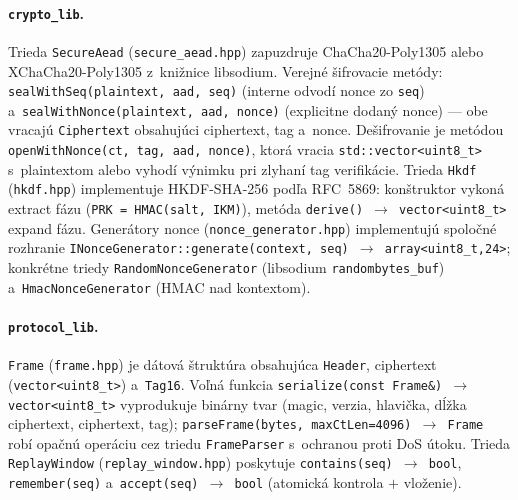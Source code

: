 \documentclass[a4paper]{feidipsp}
\begin{document}
\paragraph{\texttt{crypto\_lib}.}
Trieda \texttt{SecureAead} (\texttt{secure\_aead.hpp}) zapuzdruje ChaCha20-Poly1305 alebo XChaCha20-Poly1305 z~knižnice libsodium. Verejné šifrovacie metódy: \texttt{sealWithSeq(plaintext, aad, seq)} (interne odvodí nonce zo \texttt{seq}) a~\texttt{sealWithNonce(plaintext, aad, nonce)} (explicitne dodaný nonce) --- obe vracajú \texttt{Ciphertext} obsahujúci ciphertext, tag a~nonce. Dešifrovanie je metódou \texttt{openWithNonce(ct, tag, aad, nonce)}, ktorá vracia \texttt{std::vector<uint8\_t>} s~plaintextom alebo vyhodí výnimku pri zlyhaní tag verifikácie. Trieda \texttt{Hkdf} (\texttt{hkdf.hpp}) implementuje HKDF-SHA-256 podľa RFC~5869: konštruktor vykoná extract fázu (\texttt{PRK = HMAC(salt, IKM)}), metóda \texttt{derive() $\rightarrow$ vector<uint8\_t>} expand fázu. Generátory nonce (\texttt{nonce\_generator.hpp}) implementujú spoločné rozhranie \texttt{INonceGenerator::generate(context, seq) $\rightarrow$ array<uint8\_t,24>}; konkrétne triedy \texttt{RandomNonceGenerator} (libsodium \texttt{randombytes\_buf}) a~\texttt{HmacNonceGenerator} (HMAC nad kontextom).

\paragraph{\texttt{protocol\_lib}.}
\texttt{Frame} (\texttt{frame.hpp}) je dátová štruktúra obsahujúca \texttt{Header}, ciphertext (\texttt{vector<uint8\_t>}) a~\texttt{Tag16}. Voľná funkcia \texttt{serialize(const Frame\&) $\rightarrow$ vector<uint8\_t>} vyprodukuje binárny tvar (magic, verzia, hlavička, dĺžka ciphertext, ciphertext, tag); \texttt{parseFrame(bytes, maxCtLen=4096) $\rightarrow$ Frame} robí opačnú operáciu cez triedu \texttt{FrameParser} s~ochranou proti DoS útoku. Trieda \texttt{ReplayWindow} (\texttt{replay\_window.hpp}) poskytuje \texttt{contains(seq) $\rightarrow$ bool}, \texttt{remember(seq)} a~\texttt{accept(seq) $\rightarrow$ bool} (atomická kontrola $+$ vloženie).
\end{document}
